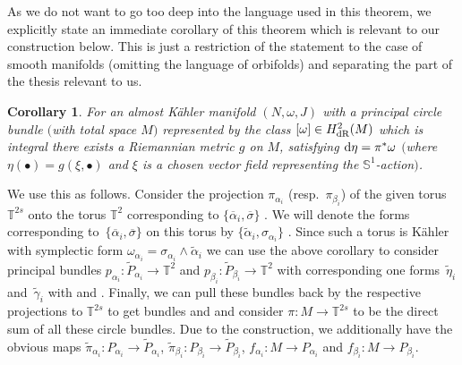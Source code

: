 \documentclass[pdftex]{sigma}
\numberwithin{equation}{section}
\newtheorem{cor}[tw]{Corollary}
\theoremstyle{definition}
\begin{document}
As we do not want to go too deep into the language used in this theorem, we explicitly state an immediate corollary of this theorem which is relevant to our construction below. This is just a restriction of the statement to the case of smooth manifolds (omitting the language of orbifolds) and separating the part of the thesis relevant to us.

\begin{cor} For an almost K\"ahler manifold $(N,\omega,J)$ with a principal circle bundle $($with total space $M)$ represented by the class $[\omega]\in H^2_{\rm dR}(M)$ which is integral there exists a Riemannian metric $g$ on $M$, satisfying ${\rm d}\eta=\pi^*\omega$ $($where $\eta(\bullet)=g(\xi,\bullet)$ and $\xi$ is a chosen vector field representing the $\mathbb{S}^1$-action$)$.
\end{cor}
We use this as follows. Consider the projection $\pi_{\alpha_i}$ (resp.\ $\pi_{\beta_i}$) of the given torus $\mathbb{T}^{2s}$ onto the torus $\mathbb{T}^2$ corresponding to $\{\overline{\alpha}_i,\overline{\sigma}\}$ . We will denote the forms corresponding to~$\{\overline{\alpha}_i,\overline{\sigma}\}$  on this torus by $\{\tilde{\alpha}_i,\sigma_{\alpha_i}\}$ . Since such a torus is K\"ahler with symplectic form $\omega_{\alpha_i}=\sigma_{\alpha_i}\wedge\tilde{\alpha}_i$  we can use the above corollary to consider principal bundles $p_{\alpha_i}\colon \tilde{P}_{\alpha_i}\to\mathbb{T}^2$ and $p_{\beta_i}\colon \tilde{P}_{\beta_i}\to\mathbb{T}^2$ with corresponding one forms~$\tilde{\eta}_i$ and~$\tilde{\gamma}_i$ with  and . Finally, we can pull these bundles back by the respective projections to $\mathbb{T}^{2s}$ to get bundles  and  and consider ${\pi\colon M\to\mathbb{T}^{2s}}$ to be the direct sum of all these circle bundles. Due to the construction, we additionally have the obvious maps $\tilde{\pi}_{\alpha_i}\colon P_{\alpha_i}\to\tilde{P}_{\alpha_i}$, $\tilde{\pi}_{\beta_i}\colon P_{\beta_i}\to\tilde{P}_{\beta_i}$, $f_{\alpha_i}\colon M\to P_{\alpha_i}$ and $f_{\beta_i}\colon M\to P_{\beta_i}$.
\end{document}
